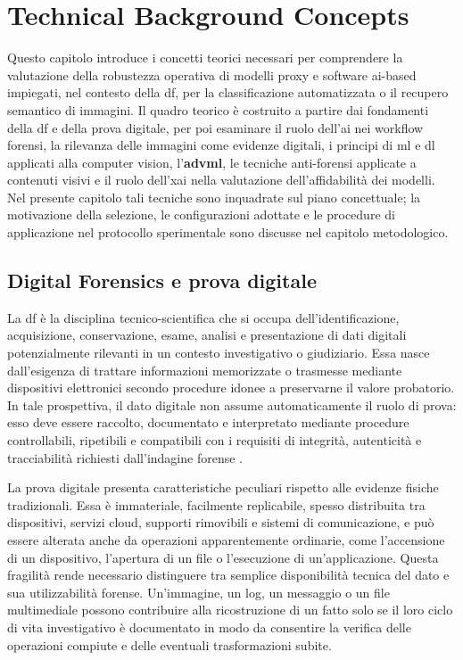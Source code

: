 \chapter{Technical Background Concepts}\label{chap:background}
Questo capitolo introduce i concetti teorici necessari per comprendere la valutazione della robustezza operativa di modelli proxy e software \gls{ai}-based impiegati, nel contesto della \gls{df}, per la classificazione automatizzata o il recupero semantico di immagini. Il quadro teorico è costruito a partire dai fondamenti della \gls{df} e della prova digitale, per poi esaminare il ruolo dell'\gls{ai} nei workflow forensi, la rilevanza delle immagini come evidenze digitali, i principi di \gls{ml} e \gls{dl} applicati alla computer vision, l'\textbf{\gls{advml}}, le tecniche anti-forensi applicate a contenuti visivi e il ruolo dell'\gls{xai} nella valutazione dell'affidabilità dei modelli. Nel presente capitolo tali tecniche sono inquadrate sul piano concettuale; la motivazione della selezione, le configurazioni adottate e le procedure di applicazione nel protocollo sperimentale sono discusse nel capitolo metodologico.

\section{Digital Forensics e prova digitale}
\label{sec:background_df_evidence}
La \gls{df} è la disciplina tecnico-scientifica che si occupa dell'identificazione, acquisizione, conservazione, esame, analisi e presentazione di dati digitali potenzialmente rilevanti in un contesto investigativo o giudiziario. Essa nasce dall'esigenza di trattare informazioni memorizzate o trasmesse mediante dispositivi elettronici secondo procedure idonee a preservarne il valore probatorio. In tale prospettiva, il dato digitale non assume automaticamente il ruolo di prova: esso deve essere raccolto, documentato e interpretato mediante procedure controllabili, ripetibili e compatibili con i requisiti di integrità, autenticità e tracciabilità richiesti dall'indagine forense \cite{casey2011digital,garfinkel2010digital,nist2006guide}.

La prova digitale presenta caratteristiche peculiari rispetto alle evidenze fisiche tradizionali. Essa è immateriale, facilmente replicabile, spesso distribuita tra dispositivi, servizi cloud, supporti rimovibili e sistemi di comunicazione, e può essere alterata anche da operazioni apparentemente ordinarie, come l'accensione di un dispositivo, l'apertura di un file o l'esecuzione di un'applicazione. Questa fragilità rende necessario distinguere tra semplice disponibilità tecnica del dato e sua utilizzabilità forense. Un'immagine, un log, un messaggio o un file multimediale possono contribuire alla ricostruzione di un fatto solo se il loro ciclo di vita investigativo è documentato in modo da consentire la verifica delle operazioni compiute e delle eventuali trasformazioni subite.

